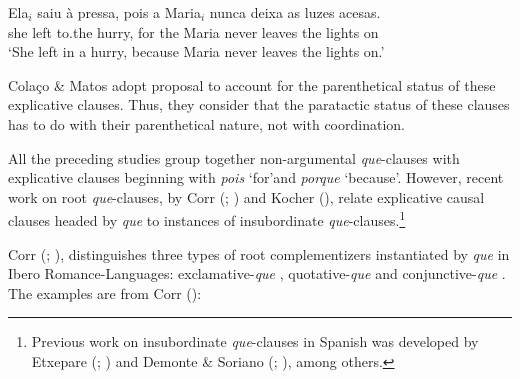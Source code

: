 \documentclass[output=paper,colorlinks,citecolor=brown,
]{langscibook}
\begin{document}
\ea \label{ex:matos:ela-saiu-pressa}
\gll Ela$_i$ saiu à pressa, pois a Maria$_i$ nunca deixa as luzes acesas.\\
     she left to.the hurry, for the Maria never leaves the lights on\\
\glt ‘She left in a hurry, because Maria never leaves the lights on.’\\
\citep[49]{colaco_explicative_2016}
\z 

Colaço \& Matos adopt \citet{de_vries_unconventional_2012} proposal to account for the parenthetical status of these explicative clauses. Thus, they consider that the paratactic status of these clauses has to do with their parenthetical nature, not with coordination.

All the preceding studies group together non-argumental \textit{que}-clauses with explicative clauses beginning with \textit{pois} ‘for’and \textit{porque} ‘because’. However, recent work on root \textit{que}-clauses, by Corr (\citeyear{corr_ibero-romance_2016}; \citeyear{corr_matrix_2018}) and Kocher (\citeyear{kocher_unselected_2019}), relate explicative causal clauses headed by \textit{que} to instances of insubordinate \textit{que}-clauses.\footnote{Previous work on insubordinate \textit{que}-clauses in Spanish was developed by Etxepare (\citeyear{etxepare_hearsay_2010}; \citeyear{etxepare_coordination_2014}) and Demonte \& Soriano (\citeyear{demonte_force_2009}; \citeyear{demonte_evidentiality_2014}), among others.}

Corr (\citeyear{corr_ibero-romance_2016}; \citeyear{corr_matrix_2018}), distinguishes three types of root complementizers instantiated by \textit{que} in Ibero Romance-Languages: exclamative-\textit{que} , quotative-\textit{que}  and conjunctive-\textit{que} .  The examples are from Corr (\citeyear[79--80]{corr_matrix_2018}):
\end{document}
